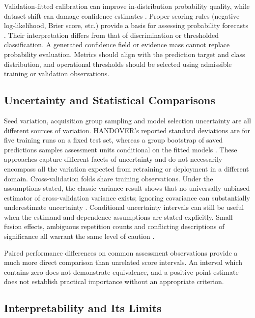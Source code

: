 Validation-fitted calibration can improve in-distribution probability quality, while dataset shift
can damage confidence estimates \parencite{Guo2017Calibration,P008}.
Proper scoring rules (negative log-likelihood, Brier score, etc.) provide a basis for assessing
probability forecasts \parencite{P055}. Their interpretation differs from that of discrimination or
thresholded classification.
A generated confidence field or evidence mass cannot replace probability evaluation. Metrics should
align with the prediction target and class distribution, and operational thresholds should be
selected using admissible training or validation observations.

\subsection{Uncertainty and Statistical Comparisons}

Seed variation, acquisition group sampling and model selection uncertainty are all different sources
of variation.
HANDOVER's reported standard deviations are for five training runs on a fixed test set, whereas a
group bootstrap of saved predictions samples assessment units conditional on the fitted models
\parencite{Thoduka2024Handover}.
These approaches capture different facets of uncertainty and do not necessarily encompass all the
variation expected from retraining or deployment in a different domain.
Cross-validation folds share training observations. Under the assumptions stated, the classic
variance result shows that no universally unbiased estimator of cross-validation variance exists;
ignoring covariance can substantially underestimate uncertainty \parencite[pp.~1096--1098, 1102--1104]{Bengio2004CVVariance}. Conditional uncertainty intervals can still be useful when the
estimand and dependence assumptions are stated explicitly.
Small fusion effects, ambiguous repetition counts and conflicting descriptions of significance all
warrant the same level of caution \parencite{Gu2024Improved,Xu2025ModalityResilient}.

Paired performance differences on common assessment observations provide a much more direct
comparison than unrelated score intervals. An interval which contains zero does not demonstrate
equivalence, and a positive point estimate does not establish practical importance without an
appropriate criterion.

\subsection{Interpretability and Its Limits}

